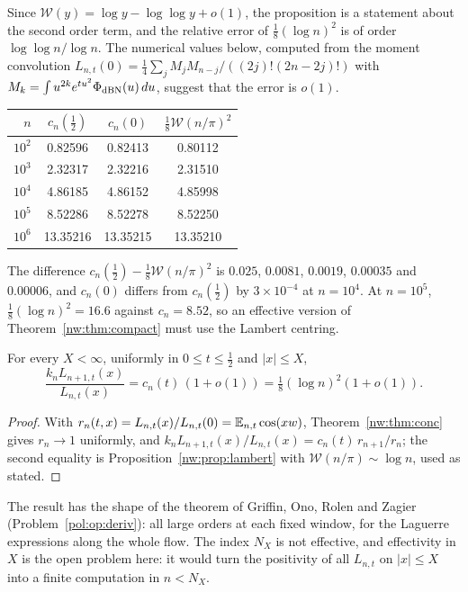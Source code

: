 Since $\mathcal W(y)=\log y-\log\log y+o(1)$, the proposition is a statement about the second order term, and the relative error of $\frac18(\log n)^2$ is of order $\log\log n/\log n$. The numerical values below, computed from the moment convolution $L_{n,t}(0)=\frac14\sum_jM_jM_{n-j}/((2j)!(2n-2j)!)$ with $M_k=\int u^{2k}e^{tu^2}\Phi_{\rm dBN}(u)\,du$, suggest that the error is $o(1)$.
\begin{center}
\begin{tabular}{rccc}
\toprule
$n$ & $c_n(\frac12)$ & $c_n(0)$ & $\frac18\mathcal W(n/\pi)^2$\\
\midrule
$10^2$ & 0.82596 & 0.82413 & 0.80112\\
$10^3$ & 2.32317 & 2.32216 & 2.31510\\
$10^4$ & 4.86185 & 4.86152 & 4.85998\\
$10^5$ & 8.52286 & 8.52278 & 8.52250\\
$10^6$ & 13.35216 & 13.35215 & 13.35210\\
\bottomrule
\end{tabular}
\end{center}
The difference $c_n(\frac12)-\frac18\mathcal W(n/\pi)^2$ is $0.025$, $0.0081$, $0.0019$, $0.00035$ and $0.00006$, and $c_n(0)$ differs from $c_n(\frac12)$ by $3\times10^{-4}$ at $n=10^4$. At $n=10^5$, $\frac18(\log n)^2=16.6$ against $c_n=8.52$, so an effective version of Theorem~\ref{nw:thm:compact} must use the Lambert centring.

\begin{theorem}[Newton]\label{nw:thm:compact}
For every $X<\infty$, uniformly in $0\le t\le\frac12$ and $|x|\le X$,
\[
\frac{k_nL_{n+1,t}(x)}{L_{n,t}(x)}=c_n(t)\,(1+o(1))=\tfrac18(\log n)^2(1+o(1)).
\]
\end{theorem}

\begin{proof}
With $r_n(t,x)=L_{n,t}(x)/L_{n,t}(0)=\mathbb{E}_{n,t}\cos(xw)$, Theorem~\ref{nw:thm:conc} gives $r_n\to1$ uniformly, and $k_nL_{n+1,t}(x)/L_{n,t}(x)=c_n(t)\,r_{n+1}/r_n$; the second equality is Proposition~\ref{nw:prop:lambert} with $\mathcal W(n/\pi)\sim\log n$, used as stated.
\end{proof}

The result has the shape of the theorem of Griffin, Ono, Rolen and Zagier \cite{GORZ19} (Problem~\ref{pol:op:deriv}): all large orders at each fixed window, for the Laguerre expressions along the whole flow. The index $N_X$ is not effective, and effectivity in $X$ is the open problem here: it would turn the positivity of all $L_{n,t}$ on $|x|\le X$ into a finite computation in $n<N_X$.

